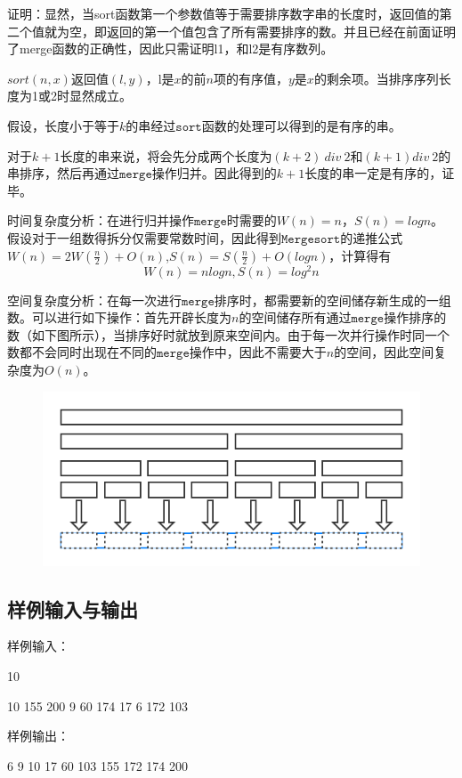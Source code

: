 \documentclass[UTF8,a4paperdui, %
]{ctexart}
\begin{document}
证明：显然，当sort函数第一个参数值等于需要排序数字串的长度时，返回值的第二个值就为空，即返回的第一个值包含了所有需要排序的数。并且已经在前面证明了merge函数的正确性，因此只需证明l1，和l2是有序数列。

$sort(n, x)$返回值$(l, y)$，l是$x$的前$n$项的有序值，$y$是$x$的剩余项。当排序序列长度为1或2时显然成立。

假设，长度小于等于$k$的串经过$\texttt{sort}$函数的处理可以得到的是有序的串。

对于$k+1$长度的串来说，将会先分成两个长度为$(k+2)\ div\ 2$和$(k+1) div\ 2$的串排序，然后再通过$\texttt{merge}$操作归并。因此得到的$k+1$长度的串一定是有序的，证毕。

时间复杂度分析：在进行归并操作$\texttt{merge}$时需要的$W(n)=n$，$S(n)=logn$。假设对于一组数得拆分仅需要常数时间，因此得到$\texttt{Mergesort}$的递推公式$W(n)=2W(\frac{n}{2})+O(n)$,$S(n)=S(\frac{n}{2})+O(logn)$，计算得有
\[
W(n)=nlogn, S(n)=log^2n
\]

空间复杂度分析：在每一次进行$\texttt{merge}$排序时，都需要新的空间储存新生成的一组数。可以进行如下操作：首先开辟长度为$n$的空间储存所有通过$\texttt{merge}$操作排序的数（如下图所示），当排序好时就放到原来空间内。由于每一次并行操作时同一个数都不会同时出现在不同的$\texttt{merge}$操作中，因此不需要大于$n$的空间，因此空间复杂度为$O(n)$。

\begin{figure}[ht]
\centering
\includegraphics[scale=0.66]{空间.png}
\end{figure}

\subsection{样例输入与输出}
样例输入：

10

10 155 200 9 60 174 17 6 172 103

样例输出：

6 9 10 17 60 103 155 172 174 200 
\end{document}
